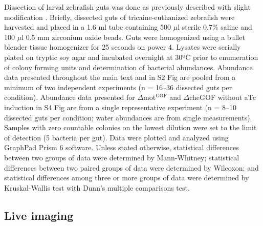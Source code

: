 {{{{{{{Dissection of larval zebrafish guts was done as previously described with slight modification \cite{milligan-myhre_study_2011}. Briefly, dissected guts of tricaine-euthanized zebrafish were harvested and placed in a 1.6 ml tube containing 500 $\mu$l sterile 0.7\% saline and 100 $\mu$l 0.5 mm zirconium oxide beads. Guts were homogenized using a bullet blender tissue homogenizer for 25 seconds on power 4. Lysates were serially plated on tryptic soy agar and incubated overnight at 30ºC prior to enumeration of colony forming units and determination of bacterial abundances. Abundance data presented throughout the main text and in S2 Fig are pooled from a minimum of two independent experiments (n = 16–36 dissected guts per condition). Abundance data presented for $\Delta$mot$^{\text{GOF}}$ and $\Delta$cheGOF without aTc induction in S4 Fig are from a single representative experiment (n = 8–10 dissected guts per condition; water abundances are from single measurements). Samples with zero countable colonies on the lowest dilution were set to the limit of detection (5 bacteria per gut). Data were plotted and analyzed using GraphPad Prism 6 software. Unless stated otherwise, statistical differences between two groups of data were determined by Mann-Whitney; statistical differences between two paired groups of data were determined by Wilcoxon; and statistical differences among three or more groups of data were determined by Kruskal-Wallis test with Dunn's multiple comparisons test.  

\subsection{Live imaging}

}}}}}}}
